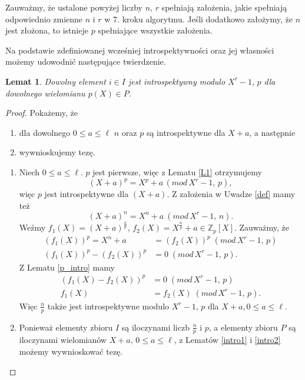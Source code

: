 \documentclass[declaration,shortabstract]{iithesis}
\theoremstyle{definition}
\theoremstyle{remark} \newtheorem{observation}{Obserwacja}
\theoremstyle{plain} \newtheorem{theorem}{Twierdzenie}
\theoremstyle{plain} \newtheorem{lemma}{Lemat}
\theoremstyle{remark} \newtheorem*{remark*}{Uwaga}
\theoremstyle{reminder} \newtheorem*{reminder*}{Przypomnienie}
\begin{document}
Zauważmy, że ustalone powyżej liczby $n, \, r$ spełniają założenia, jakie spełniają odpowiednio zmienne $n$ i $r$ w 7. kroku algorytmu. Jeśli dodatkowo założymy, że $n$ jest złożona, to istnieje $p$ spełniające wszystkie założenia.

Na podstawie zdefiniowanej wcześniej introspektywności oraz jej własności możemy udowodnić następujące twierdzenie.

\begin{lemma}\label{intro}
	Dowolny element $i \in I$ jest introspektywny modulo $X^r - 1, \, p$ dla dowolnego wielomianu $p(X) \in P$.
\end{lemma}
	
\begin{proof}
	Pokażemy, że 
	\begin{enumerate}[label=\arabic*.,leftmargin=.4in] 
		\item dla dowolnego $0 \leq a \leq \ell$ $n$ oraz $p$ są introspektywne dla $X + a$, a następnie 
		\item wywnioskujemy tezę.
	\end{enumerate}
	\begin{enumerate}[label=Ad.\arabic*.,leftmargin=.4in]
		\item Niech $0 \leq a \leq \ell$. $p$ jest pierwsze, więc z Lematu \ref{L1} otrzymujemy \[(X + a)^p = X^p + a \, (mod \, X^r - 1, \, p),\] więc $p$ jest introspektywne dla $(X + a)$. Z założenia w Uwadze \ref{def} mamy też  \[(X + a)^n = X^n + a \: (mod \, X^r - 1, \, n).\] Weźmy $f_1(X) = (X + a)^{\frac{n}{p}}, \, f_2(X) = X^{\frac{n}{p}} + a \in \mathbb{Z}_p[X]$. Zauważmy, że 
		      \begin{align*}
		      	(f_1(X))^p = X^n + a    & = (f_2(X))^p \; (mod \, X^r - 1, \, p) \\
		      	(f_1(X))^p - (f_2(X))^p & = 0 \; (mod \, X^r - 1, \, p).         
		      \end{align*}
		      Z Lematu \ref{p_intro} mamy
		      \begin{align*}
		      	(f_1(X) - f_2(X))^p & = 0 \; (mod \, X^r - 1, \, p)       \\
		      	f_1(X)              & = f_2(X) \; (mod \, X^r - 1, \, p). 
		      \end{align*}
		      Więc $\frac{n}{p}$ także jest introspektywne modulo $X^r - 1, \, p$ dla $X + a, 0 \leq a \leq \ell$.
		\item Ponieważ elementy zbioru $I$ są iloczynami liczb $\frac{n}{p}$ i $p$, a elementy zbioru $P$ są iloczynami wielomianów $X + a, \, 0 \leq a \leq \ell$, z Lematów \ref{intro1} i \ref{intro2} możemy wywnioskować tezę.
	\end{enumerate}
\end{proof} 
\end{document}
